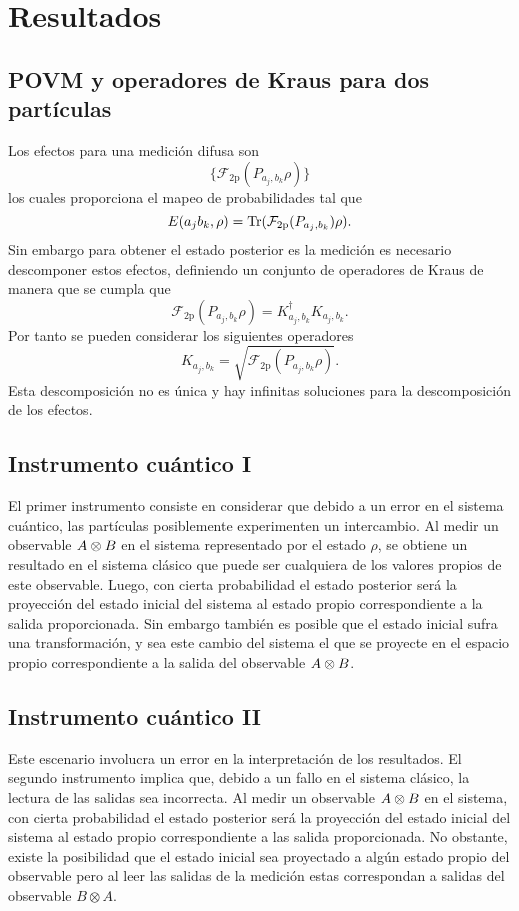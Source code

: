 \documentclass[12pt,letterpaper]{book}\raggedbottom{}
\begin{document}
\section{Resultados}

\subsection{POVM y operadores de Kraus para dos partículas}
Los efectos para una medición difusa son \[\{\mathcal{F}_{2\text{p}}(P_{a_j,b_k}\rho)\}\]los cuales proporciona el mapeo de probabilidades tal que \[   E(a_j b_k, \rho)= {\rm Tr}(\mathcal{F}_{2\text{p}}({P_{a_j,b_k}})\rho).\] Sin embargo para obtener el estado posterior es la medición es necesario descomponer estos efectos, definiendo un conjunto de operadores de Kraus de manera que se cumpla que \[\mathcal{F}_{2\text{p}}(P_{a_j,b_k}\rho)=K_{a_j,b_k}^\dagger K_{a_j,b_k}.\] Por tanto se pueden considerar los siguientes operadores \[K_{a_j,b_k}=\sqrt{\mathcal{F}_{2\text{p}}(P_{a_j,b_k}\rho)}.\] Esta descomposición no es única y hay infinitas soluciones para la descomposición de los efectos.



\subsection{Instrumento cuántico I}

El primer instrumento consiste en considerar que debido a un error en el
sistema cuántico, las partículas posiblemente experimenten un intercambio. Al
medir un observable ${A \otimes B}$ en el sistema representado por el estado
$\rho$, se obtiene un resultado  en el sistema clásico que puede ser cualquiera
de los valores propios de este observable. Luego, con cierta probabilidad el
estado posterior será la proyección del estado inicial del sistema al estado
propio correspondiente a la salida proporcionada. Sin embargo también es
posible que el estado inicial sufra una transformación, y sea este cambio del
sistema el que se proyecte en el espacio propio correspondiente a la salida del
observable $A\otimes B$.

\subsection{Instrumento cuántico II}

Este escenario involucra un error en la interpretación de los resultados. El segundo instrumento implica que, debido a un fallo en el sistema clásico, la lectura de las salidas sea incorrecta. Al medir un observable ${A \otimes B}$ en el sistema, con cierta probabilidad el estado posterior será la proyección del estado inicial del sistema al estado propio correspondiente a las salida proporcionada. No obstante, existe la posibilidad que el estado inicial sea proyectado a algún estado propio del observable pero al leer las salidas de la medición estas correspondan a salidas del observable $B\otimes A$.
\end{document}
